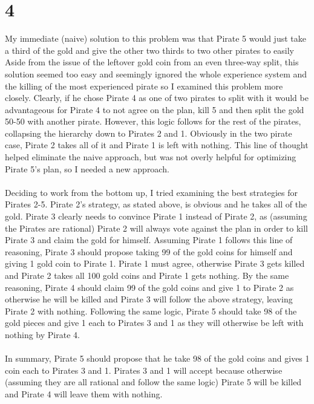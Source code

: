 \documentclass[letterpaper,notitlepage,twoside]{article}
\begin{document}
\section*{4}
My immediate (naive) solution to this problem was that Pirate 5 would just take a third of the gold and give the other two thirds to two other pirates to easily  Aside from the issue of the leftover gold coin from an even three-way split, this solution seemed too easy and seemingly ignored the whole experience system and the killing of the most experienced pirate so I examined this problem more closely. Clearly, if he chose Pirate 4 as one of two pirates to split with it would be advantageous for Pirate 4 to not agree on the plan, kill 5 and then split the gold 50-50 with another pirate. However, this logic follows for the rest of the pirates, collapsing the hierarchy down to Pirates 2 and 1. Obviously in the two pirate case, Pirate 2 takes all of it and Pirate 1 is left with nothing. This line of thought helped eliminate the naive approach, but was not overly helpful for optimizing Pirate 5's plan, so I needed a new approach.\\
\\
Deciding to work from the bottom up, I tried examining the best strategies for Pirates 2-5. Pirate 2's strategy, as stated above, is obvious and he takes all of the gold. Pirate 3 clearly needs to convince Pirate 1 instead of Pirate 2, as (assuming the Pirates are rational) Pirate 2 will always vote against the plan in order to kill Pirate 3 and claim the gold for himself. Assuming Pirate 1 follows this line of reasoning, Pirate 3 should propose taking 99 of the gold coins for himself and giving 1 gold coin to Pirate 1. Pirate 1 must agree, otherwise Pirate 3 gets killed and Pirate 2 takes all 100 gold coins and Pirate 1 gets nothing. By the same reasoning, Pirate 4 should claim 99 of the gold coins and give 1 to Pirate 2 as otherwise he will be killed and Pirate 3 will follow the above strategy, leaving Pirate 2 with nothing. Following the same logic, Pirate 5 should take 98 of the gold pieces and give 1 each to Pirates 3 and 1 as they will otherwise be left with nothing by Pirate 4. \\
\\
In summary, Pirate 5 should propose that he take 98 of the gold coins and gives 1 coin each to Pirates 3 and 1. Pirates 3 and 1 will accept because otherwise (assuming they are all rational and follow the same logic) Pirate 5 will be killed and Pirate 4 will leave them with nothing. 
\end{document}
